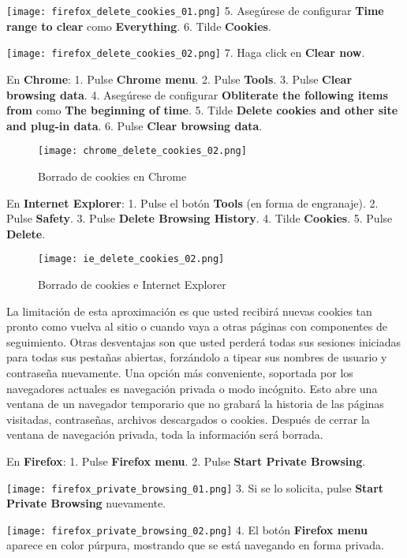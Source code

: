 \documentclass[10pt,a5paper,twoside,,]{book}
\begin{document}
\texttt{[image: firefox\_delete\_cookies\_01.png]} 5. Asegúrese de
configurar \textbf{Time range to clear} como \textbf{Everything}. 6.
Tilde \textbf{Cookies}.

\texttt{[image: firefox\_delete\_cookies\_02.png]} 7. Haga click en
\textbf{Clear now}.

En \textbf{Chrome}: 1. Pulse \textbf{Chrome menu}. 2. Pulse
\textbf{Tools}. 3. Pulse \textbf{Clear browsing data}. 4. Asegúrese de
configurar \textbf{Obliterate the following items from} como \textbf{The
beginning of time}. 5. Tilde \textbf{Delete cookies and other site and
plug-in data}. 6. Pulse \textbf{Clear browsing data}.

\begin{figure}[htbp]
\centering
\texttt{[image: chrome\_delete\_cookies\_02.png]}
\caption{Borrado de cookies en Chrome}
\end{figure}

En \textbf{Internet Explorer}: 1. Pulse el botón \textbf{Tools} (en
forma de engranaje). 2. Pulse \textbf{Safety}. 3. Pulse \textbf{Delete
Browsing History}. 4. Tilde \textbf{Cookies}. 5. Pulse \textbf{Delete}.

\begin{figure}[htbp]
\centering
\texttt{[image: ie\_delete\_cookies\_02.png]}
\caption{Borrado de cookies e Internet Explorer}
\end{figure}

La limitación de esta aproximación es que usted recibirá nuevas cookies
tan pronto como vuelva al sitio o cuando vaya a otras páginas con
componentes de seguimiento. Otras desventajas son que usted perderá
todas sus sesiones iniciadas para todas sus pestañas abiertas,
forzándolo a tipear sus nombres de usuario y contraseña nuevamente. Una
opción más conveniente, soportada por los navegadores actuales es
navegación privada o modo incógnito. Esto abre una ventana de un
navegador temporario que no grabará la historia de las páginas
visitadas, contraseñas, archivos descargados o cookies. Después de
cerrar la ventana de navegación privada, toda la información será
borrada.

En \textbf{Firefox}: 1. Pulse \textbf{Firefox menu}. 2. Pulse
\textbf{Start Private Browsing}.

\texttt{[image: firefox\_private\_browsing\_01.png]} 3. Si se lo solicita,
pulse \textbf{Start Private Browsing} nuevamente.

\texttt{[image: firefox\_private\_browsing\_02.png]} 4. El botón
\textbf{Firefox menu} aparece en color púrpura, mostrando que se está
navegando en forma privada.
\end{document}
